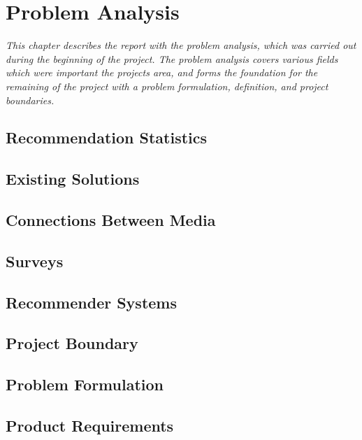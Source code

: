 \chapter{Problem Analysis}

\textit{This chapter describes the report with the problem analysis, which was carried out during the beginning of the project. The problem analysis covers various fields which were important the projects area, and forms the foundation for the remaining of the project with a problem formulation, definition, and project boundaries.}

\section{Recommendation Statistics}
\label{Statistics}

\section{Existing Solutions}
\label{Existing}

\section{Connections Between Media}
\label{Connections}

\section{Surveys}
\label{Surveys}

\section{Recommender Systems}
\label{RecommenderSystems}

\section{Project Boundary}
\label{Boundary}

\section{Problem Formulation}
\label{Formulation}

\section{Product Requirements}
\label{Requirements}
